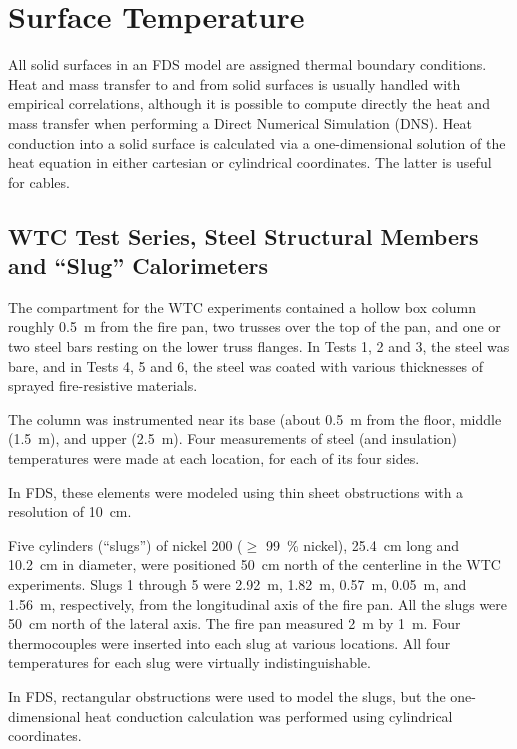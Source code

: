 
\chapter{Surface Temperature}

All solid surfaces in an FDS model are assigned thermal boundary conditions.
Heat and mass transfer to and from solid surfaces is
usually handled with empirical correlations, although it is possible
to compute directly the heat and mass transfer when performing a
Direct Numerical Simulation (DNS). Heat conduction into a solid surface is calculated via a one-dimensional solution of
the heat equation in either cartesian or cylindrical coordinates. The latter is useful for cables.

\section{WTC Test Series, Steel Structural Members and ``Slug'' Calorimeters}

The compartment for the WTC experiments contained a hollow box column roughly 0.5~m from the fire pan, two trusses over the top
of the pan, and one or two steel bars resting on the lower truss flanges. In Tests 1, 2 and 3, the steel was bare, and in Tests 4, 5 and 6, the
steel was coated with various thicknesses of sprayed fire-resistive materials.

The column was instrumented near its base (about
0.5~m from the floor, middle (1.5~m), and upper (2.5~m). Four measurements of steel (and insulation) temperatures were made at each location, for
each of its four sides.

In FDS, these elements were modeled using thin sheet obstructions with a resolution of 10~cm.

Five cylinders (``slugs'') of nickel 200 ($\ge$ 99~\% nickel), 25.4~cm long and 10.2~cm in diameter, were positioned
50~cm north of the centerline in the WTC experiments. Slugs 1 through 5 were 2.92~m, 1.82~m, 0.57~m, 0.05~m, and 1.56~m, respectively, from the
longitudinal axis of the fire pan. All the slugs were 50~cm north of the lateral axis. The fire pan measured 2~m by 1~m. Four thermocouples were
inserted into each slug at various locations. All four temperatures for each slug were virtually indistinguishable.

In FDS, rectangular obstructions were used to model the slugs, but the one-dimensional heat conduction calculation was performed using
cylindrical coordinates.

\newpage



